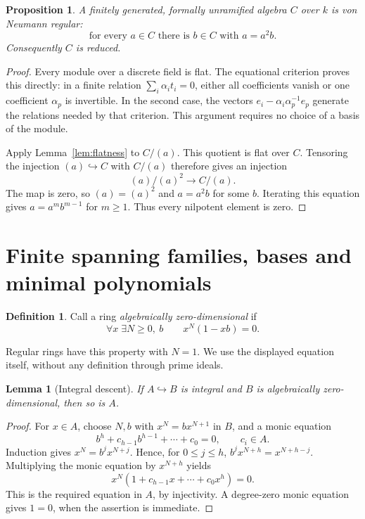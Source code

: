 \documentclass[11pt]{article}
\newtheorem{proposition}[theorem]{Proposition}
\newtheorem{lemma}[theorem]{Lemma}
\theoremstyle{definition}
\newtheorem{definition}[theorem]{Definition}
\theoremstyle{remark}
\begin{document}
\begin{proposition}\label{prop:regular}
A finitely generated, formally unramified algebra $C$ over $k$ is
von Neumann regular:
\[
 \text{for every }a\in C\text{ there is }b\in C\text{ with }a=a^2b.
\]
Consequently $C$ is reduced.
\end{proposition}
\begin{proof}
Every module over a discrete field is flat. The equational criterion
proves this directly: in a finite relation $\sum_i\alpha_i t_i=0$,
either all coefficients vanish or one coefficient $\alpha_p$ is
invertible. In the second case, the vectors
$e_i-\alpha_i\alpha_p^{-1}e_p$ generate the relations needed by that
criterion. This argument requires no choice of a basis of the module.

Apply Lemma~\ref{lem:flatness} to $C/(a)$. This quotient is flat over
$C$. Tensoring the injection $(a)\hookrightarrow C$ with $C/(a)$
therefore gives an injection
\[
 (a)/(a)^2\longrightarrow C/(a).
\]
The map is zero, so $(a)=(a)^2$ and $a=a^2b$ for some $b$.
Iterating this equation gives $a=a^m b^{m-1}$ for $m\geq1$.
Thus every nilpotent element is zero.
\end{proof}

\section{Finite spanning families, bases and minimal polynomials}

\begin{definition}
Call a ring \emph{algebraically zero-dimensional} if
\[
 \forall x\;\exists N\geq0,\ b\qquad x^N(1-xb)=0.
\]
\end{definition}
Regular rings have this property with $N=1$. We use the displayed
equation itself, without any definition through prime ideals.

\begin{lemma}[Integral descent]\label{lem:descent}
If $A\hookrightarrow B$ is integral and $B$ is algebraically
zero-dimensional, then so is $A$.
\end{lemma}
\begin{proof}
For $x\in A$, choose $N,b$ with $x^N=bx^{N+1}$ in $B$, and a monic
equation
\[
 b^h+c_{h-1}b^{h-1}+\cdots+c_0=0,\qquad c_i\in A.
\]
Induction gives $x^N=b^j x^{N+j}$. Hence, for $0\leq j\leq h$,
$b^j x^{N+h}=x^{N+h-j}$. Multiplying the monic equation by
$x^{N+h}$ yields
\[
 x^N(1+c_{h-1}x+\cdots+c_0x^h)=0.
\]
This is the required equation in $A$, by injectivity. A degree-zero
monic equation gives $1=0$, when the assertion is immediate.
\end{proof}
\end{document}
